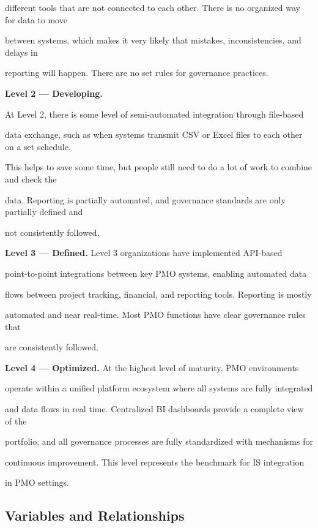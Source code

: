 different tools that are not connected to each other. There is no organized way for data to move 

between systems, which makes it very likely that mistakes, inconsistencies, and delays in 

reporting will happen. There are no set rules for governance practices. 

  

\textbf{Level 2 --- Developing.}  

At Level 2, there is some level of semi-automated integration through file-based 

data exchange, such as when systems transmit CSV or Excel files to each other on a set schedule. 

This helps to save some time, but people still need to do a lot of work to combine and check the 

data. Reporting is partially automated, and governance standards are only partially defined and 

not consistently followed. 

\textbf{Level 3 --- Defined.} Level 3 organizations have implemented API-based  

point-to-point integrations between key PMO systems, enabling automated data  

flows between project tracking, financial, and reporting tools. Reporting is mostly 

automated and near real-time. Most PMO functions have clear governance rules that 

are consistently followed. 

  

\textbf{Level 4 --- Optimized.} At the highest level of maturity, PMO environments  

operate within a unified platform ecosystem where all systems are fully integrated  

and data flows in real time. Centralized BI dashboards provide a complete view of the 

portfolio, and all governance processes are fully standardized with mechanisms for 

continuous improvement. This level represents the benchmark for IS integration 

in PMO settings. 

 

\subsection{Variables and Relationships} 

